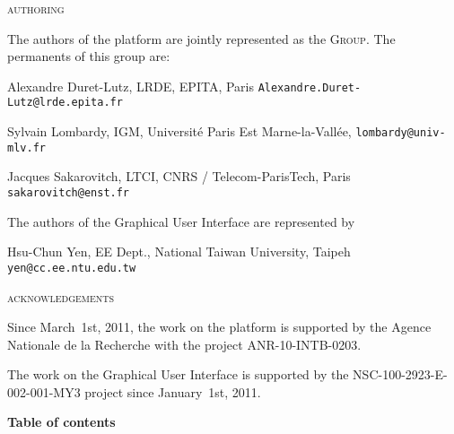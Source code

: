 \begin{center}
        \textsc{authoring}
    \end{center}

	\noindent 
The authors of the \vcsn platform are jointly represented  
 as the \vcsn \textsc{Group}.
% 
The permanents of this group are:

\medskip
	\noindent 
Alexandre Duret-Lutz, LRDE, EPITA, Paris 
\PushLine 
{\tt Alexandre.Duret-Lutz@lrde.epita.fr}

	\noindent 
Sylvain Lombardy, IGM, Universit\'e Paris Est Marne-la-Vall\'ee,
\PushLine 
 {\tt lombardy@univ-mlv.fr}
 
	\noindent 
Jacques Sakarovitch, LTCI, CNRS / Telecom-ParisTech, Paris 
\PushLine 
 {\tt sakarovitch@enst.fr}
 
 \bigskip
	\noindent 
The authors of the \vgi Graphical User Interface are represented by

\medskip
\noindent
Hsu-Chun Yen, EE Dept., National Taiwan University, Taipeh
\PushLine 
{\tt yen@cc.ee.ntu.edu.tw}


\vspace*{20pt}

\begin{center}
        \textsc{acknowledgements}
    \end{center}

\noindent
Since March~1st, 2011, the work on the \vcsn platform is supported by 
the Agence Nationale de la Recherche with the project 
ANR-10-INTB-0203.

\smallskip 
\noindent
The work on the Graphical User Interface \vgi is  supported by the  
NSC-100-2923-E-002-001-MY3  project since January~1st, 2011. 


\newpage
\begin{center}
    {\Large \textbf{Table of contents}}
\end{center}

\makeatletter
{}
\makeatother



\endinput 


